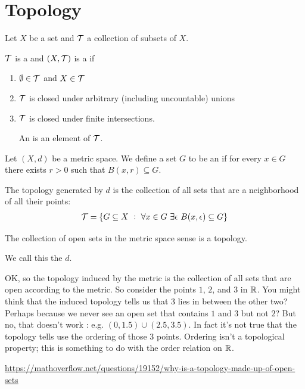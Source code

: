 \section{Topology}

\begin{definition}
  Let $X$ be a set and $\mathcal T$ a collection of subsets of $X$.

  $\mathcal T$ is a  and $(X, \mathcal T)$ is a  if
  \begin{enumerate}
  \item $\emptyset \in \mathcal T$ and $X \in \mathcal T$
  \item $\mathcal T$ is closed under arbitrary (including uncountable) unions
  \item $\mathcal T$ is closed under finite intersections.

  An  is an element of $\mathcal T$.
\end{enumerate}
\end{definition}


Let $(X, d)$ be a metric space. We define a set $G$ to be an  if for
every $x \in G$ there exists $r > 0$ such that $B(x, r) \subseteq G$.

The topology generated by $d$ is the collection of all sets that are a neighborhood of all their points:
  \begin{align*}
    \mathcal T = \{ G \subseteq X ~:~ \forall x \in G ~ \exists \epsilon ~ B(x, \epsilon) \subseteq G \}
  \end{align*}
\begin{lemma}
  The collection of open sets in the metric space sense is a topology.

  We call this the  $d$.
\end{lemma}

OK, so the topology induced by the metric is the collection of all sets that are open according to the metric.
So consider the points $1$, $2$, and $3$ in $\mathbb{R}$. You might think that the induced topology tells us that $3$
lies in between the other two? Perhaps because we never see an open set that contains $1$ and $3$ but not $2$?
But no, that doesn't work : e.g. $(0, 1.5) \cup (2.5, 3.5)$. In fact it's not true that the topology tells use
the ordering of those 3 points. Ordering isn't a topological property; this is something to do with the order
relation on $\mathbb{R}$.

\url{https://mathoverflow.net/questions/19152/why-is-a-topology-made-up-of-open-sets}


